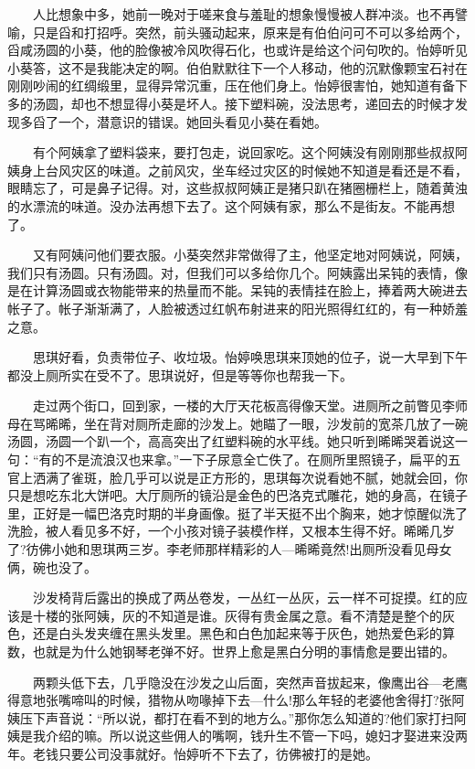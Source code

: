 \documentclass[12pt,UTF8]{ctexbook}
\begin{document}
　　人比想象中多，她前一晚对于嗟来食与羞耻的想象慢慢被人群冲淡。也不再譬喻，只是舀和打招呼。突然，前头骚动起来，原来是有伯伯问可不可以多给两个，舀咸汤圆的小葵，他的脸像被冷风吹得石化，也或许是给这个问句吹的。怡婷听见小葵答，这不是我能决定的啊。伯伯默默往下一个人移动，他的沉默像颗宝石衬在刚刚吵闹的红绸缎里，显得异常沉重，压在他们身上。怡婷很害怕，她知道有备下多的汤圆，却也不想显得小葵是坏人。接下塑料碗，没法思考，递回去的时候才发现多舀了一个，潜意识的错误。她回头看见小葵在看她。

　　有个阿姨拿了塑料袋来，要打包走，说回家吃。这个阿姨没有刚刚那些叔叔阿姨身上台风灾区的味道。之前风灾，坐车经过灾区的时候她不知道是看还是不看，眼睛忘了，可是鼻子记得。对，这些叔叔阿姨正是猪只趴在猪圈栅栏上，随着黄浊的水漂流的味道。没办法再想下去了。这个阿姨有家，那么不是街友。不能再想了。

　　又有阿姨问他们要衣服。小葵突然非常做得了主，他坚定地对阿姨说，阿姨，我们只有汤圆。只有汤圆。对，但我们可以多给你几个。阿姨露出呆钝的表情，像是在计算汤圆或衣物能带来的热量而不能。呆钝的表情挂在脸上，捧着两大碗进去帐子了。帐子渐渐满了，人脸被透过红帆布射进来的阳光照得红红的，有一种娇羞之意。

　　思琪好看，负责带位子、收垃圾。怡婷唤思琪来顶她的位子，说一大早到下午都没上厕所实在受不了。思琪说好，但是等等你也帮我一下。

　　走过两个街口，回到家，一楼的大厅天花板高得像天堂。进厕所之前瞥见李师母在骂晞晞，坐在背对厕所走廊的沙发上。她瞄了一眼，沙发前的宽茶几放了一碗汤圆，汤圆一个趴一个，高高突出了红塑料碗的水平线。她只听到晞晞哭着说这一句：\enquote{有的不是流浪汉也来拿。}一下子尿意全亡佚了。在厕所里照镜子，扁平的五官上洒满了雀斑，脸几乎可以说是正方形的，思琪每次说看她不腻，她就会回，你只是想吃东北大饼吧。大厅厕所的镜沿是金色的巴洛克式雕花，她的身高，在镜子里，正好是一幅巴洛克时期的半身画像。挺了半天挺不出个胸来，她才惊醒似洗了洗脸，被人看见多不好，一个小孩对镜子装模作样，又根本生得不好。晞晞几岁了?彷佛小她和思琪两三岁。李老师那样精彩的人---晞晞竟然!出厕所没看见母女俩，碗也没了。

　　沙发椅背后露出的换成了两丛卷发，一丛红一丛灰，云一样不可捉摸。红的应该是十楼的张阿姨，灰的不知道是谁。灰得有贵金属之意。看不清楚是整个的灰色，还是白头发夹缠在黑头发里。黑色和白色加起来等于灰色，她热爱色彩的算数，也就是为什么她钢琴老弹不好。世界上愈是黑白分明的事情愈是要出错的。

　　两颗头低下去，几乎隐没在沙发之山后面，突然声音拔起来，像鹰出谷---老鹰得意地张嘴啼叫的时候，猎物从吻喙掉下去---什么!那么年轻的老婆他舍得打?张阿姨压下声音说：\enquote{所以说，都打在看不到的地方么。}那你怎么知道的?他们家打扫阿姨是我介绍的嘛。所以说这些佣人的嘴啊，钱升生不管一下吗，媳妇才娶进来没两年。老钱只要公司没事就好。怡婷听不下去了，彷佛被打的是她。
\end{document}
